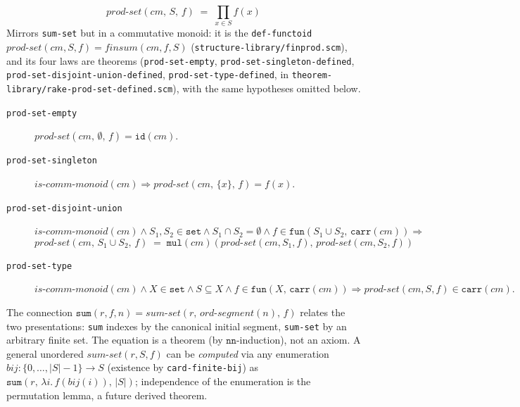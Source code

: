\[
   \mathit{prod\text{-}set}(\mathit{cm},\, S,\, f) \;=\; \prod_{x \in S} f(x)
\]
Mirrors \texttt{sum-set} but in a commutative monoid: it is the
\texttt{def-functoid} $\mathit{prod\text{-}set}(\mathit{cm}, S, f) =
\mathit{finsum}(\mathit{cm}, f, S)$ (\texttt{structure-library/finprod.scm}), and
its four laws are theorems (\texttt{prod-set-empty},
\texttt{prod-set-singleton-defined}, \texttt{prod-set-disjoint-union-defined},
\texttt{prod-set-type-defined}, in \texttt{theorem-library/rake-prod-set-defined.scm}),
with the same hypotheses omitted below.
\begin{description}
\item[\texttt{prod-set-empty}]
  $\mathit{prod\text{-}set}(\mathit{cm},\, \emptyset,\, f) = \mathtt{id}(\mathit{cm})$.
\item[\texttt{prod-set-singleton}]
  $\mathit{is\text{-}comm\text{-}monoid}(\mathit{cm}) \Rightarrow
   \mathit{prod\text{-}set}(\mathit{cm},\, \{x\},\, f) = f(x)$.
\item[\texttt{prod-set-disjoint-union}]
  $\mathit{is\text{-}comm\text{-}monoid}(\mathit{cm}) \land
   S_1, S_2 \in \mathtt{set} \land S_1 \cap S_2 = \emptyset \land
   f \in \mathtt{fun}(S_1 \cup S_2,\, \mathtt{carr}(\mathit{cm})) \Rightarrow$
  \[
    \mathit{prod\text{-}set}(\mathit{cm},\, S_1 \cup S_2,\, f)
    \;=\; \mathtt{mul}(\mathit{cm})(\mathit{prod\text{-}set}(\mathit{cm}, S_1, f),\,
                                    \mathit{prod\text{-}set}(\mathit{cm}, S_2, f))
  \]
\item[\texttt{prod-set-type}]
  $\mathit{is\text{-}comm\text{-}monoid}(\mathit{cm}) \land X \in \mathtt{set}
   \land S \subseteq X \land f \in \mathtt{fun}(X,\, \mathtt{carr}(\mathit{cm}))
   \Rightarrow \mathit{prod\text{-}set}(\mathit{cm}, S, f) \in \mathtt{carr}(\mathit{cm}).$
\end{description}

\begin{remark}
The connection $\mathtt{sum}(r, f, n) =
\mathit{sum\text{-}set}(r,\, \mathit{ord\text{-}segment}(n),\, f)$
relates the two presentations: \texttt{sum} indexes by the canonical
initial segment, \texttt{sum-set} by an arbitrary finite set.
The equation is a theorem (by $\mathtt{nn}$-induction), not an axiom.
A general unordered $\mathit{sum\text{-}set}(r, S, f)$ can be
\emph{computed} via any enumeration $\mathit{bij}:\{0,\ldots,|S|-1\}\to S$
(existence by \texttt{card-finite-bij}) as
$\mathtt{sum}(r,\, \lambda i.\, f(\mathit{bij}(i)),\, |S|)$;
independence of the enumeration is the permutation lemma, a future
derived theorem.
\end{remark}

